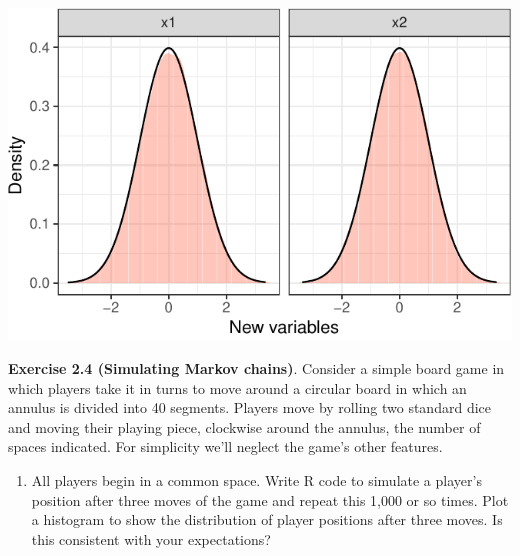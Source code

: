 \documentclass[]{article}
\providecommand{\tightlist}{%
  \setlength{\itemsep}{0pt}\setlength{\parskip}{0pt}}
\begin{document}
\begin{center}\includegraphics{exercises_files/figure-latex/unnamed-chunk-5-1} \end{center}

\textbf{Exercise 2.4 (Simulating Markov chains)}. Consider a simple
board game in which players take it in turns to move around a circular
board in which an annulus is divided into 40 segments. Players move by
rolling two standard dice and moving their playing piece, clockwise
around the annulus, the number of spaces indicated. For simplicity we'll
neglect the game's other features.

\begin{enumerate}
\def\labelenumi{\arabic{enumi}.}
\tightlist
\item
  All players begin in a common space. Write R code to simulate a
  player's position after three moves of the game and repeat this 1,000
  or so times. Plot a histogram to show the distribution of player
  positions after three moves. Is this consistent with your
  expectations?
\end{enumerate}
\end{document}
